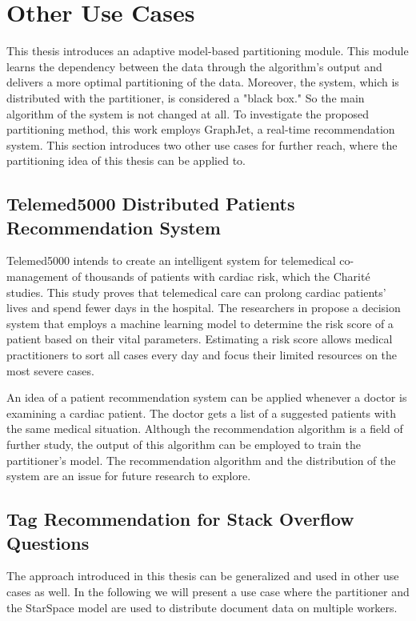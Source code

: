 \section{Other Use Cases}
\label{sec:other-use-cases}
This thesis introduces an adaptive model-based partitioning module. This module learns the dependency between the data through the algorithm's output and delivers a more optimal partitioning of the data. Moreover, the system, which is distributed with the partitioner, is considered a "black box." So the main algorithm of the system is not changed at all. To investigate the proposed partitioning method, this work employs GraphJet, a real-time recommendation system. This section introduces two other use cases for further reach, where the partitioning idea of this thesis can be applied to.

\subsection{Telemed5000 Distributed Patients Recommendation System}
\label{subsec:telemed5000}
Telemed5000 intends to create an intelligent system for telemedical co-management of thousands of patients with cardiac risk, which the Charité studies. This study proves that telemedical care can prolong cardiac patients' lives and spend fewer days in the hospital. The researchers in \cite{gontarskaPredictingMedicalInterventions2021} propose a decision system that employs a machine learning model to determine the risk score of a patient based on their vital parameters. Estimating a risk score allows medical practitioners to sort all cases every day and focus their limited resources on the most severe cases. 


An idea of a patient recommendation system can be applied whenever a doctor is examining a cardiac patient. The doctor gets a list of a suggested patients with the same medical situation. Although the recommendation algorithm is a field of further study, the output of this algorithm can be employed to train the partitioner's model. The recommendation algorithm and the distribution of the system are an issue for future research to explore.


\subsection{Tag Recommendation for Stack Overflow Questions}
\label{subsec:stackoverflow-tag-recommendation}
The approach introduced in this thesis can be generalized and used in other use cases as well. In the following we will present a use case where the partitioner and the StarSpace model are used to distribute document data on multiple workers.


